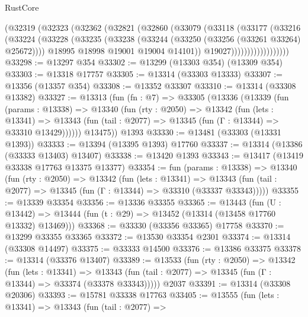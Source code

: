 \begin{lexlean}{RustCore}
\begin{coremodule}
                    (@32319
                      (@32323
                        (@32362
                          (@32821
                            (@32860
                              (@33079
                                (@33118
                                  (@33177
                                    (@33216
                                      (@33224
                                        (@33228
                                          (@33235
                                            (@33238
                                              (@33244 (@33250 (@33256 (@33261 @33264) @25672))))
                                            @18995
                                            @18998
                                            @19001
                                            @19004
                                            @14101))
                                        @19027))))))))))))))))))
@33298 := @13297 @354
@33302 := @13299 (@13303 @354) (@13309 @354)
@33303 := @13318 @17757
@33305 := @13314 (@33303 @13333)
@33307 := @13356 (@13357 @354)
@33308 := @13352 @33307
@33310 := @13314 (@33308 @13382)
@33327 := @13313
    (fun (fn : @7) =>
    @33305
      (@13336
        (@13339
          (fun (params : @13338) =>
          @13340
            (fun (rty : @2050) =>
            @13342
              (fun (lets : @13341) =>
              @13343 (fun (tail : @2077) => @13345 (fun (Γ : @13344) => @33310 @13429))))))
        @13475))
    @1393
@33330 := @13481 (@33303 (@13331 @1393))
@33333 := @13394 (@13395 @1393) @17760
@33337 := @13314 (@13386 (@33333 @13403) @13407)
@33338 := @13420 @1393
@33343 := @13417 (@13419 @33338 @17763 @13375 @13377)
@33354 := fun (params : @13338) =>
  @13340
    (fun (rty : @2050) =>
    @13342
      (fun (lets : @13341) =>
      @13343 (fun (tail : @2077) => @13345 (fun (Γ : @13344) => @33310 (@33337 @33343)))))
@33355 := @13339 @33354
@33356 := @13336 @33355
@33365 := @13443
    (fun (U : @13442) => @13444 (fun (t : @29) => @13452 (@13314 (@13458 @17760 @13332) @13469)))
@33368 := @33330 (@33356 @33365) @17758
@33370 := @13299 @33355 @33365
@33372 := @13530 @33354 @2301
@33374 := @13314 (@33308 @14497)
@33375 := @33333 @14500
@33376 := @13386 @33375
@33378 := @13314 (@33376 @13407)
@33389 := @13533
    (fun (rty : @2050) =>
    @13342
      (fun (lets : @13341) =>
      @13343 (fun (tail : @2077) => @13345 (fun (Γ : @13344) => @33374 (@33378 @33343)))))
    @2037
@33391 := @13314 (@33308 @20306)
@33393 := @15781 @33338 @17763
@33405 := @13555
    (fun (lets : @13341) =>
    @13343
      (fun (tail : @2077) =>

\end{coremodule}
\end{lexlean}

